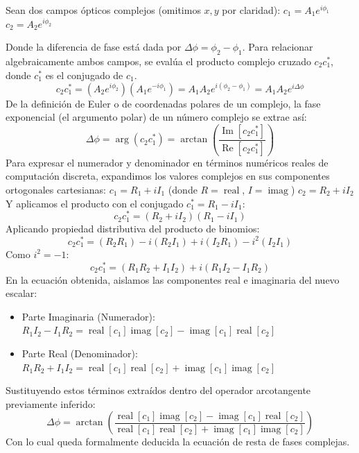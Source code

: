 \documentclass[12pt,letterpaper]{article}
\begin{document}
	Sean dos campos ópticos complejos (omitimos $x,y$ por claridad):
	$c_1 = A_1 e^{i\phi_1}$
	$c_2 = A_2 e^{i\phi_2}$
	
	Donde la diferencia de fase está dada por $\Delta\phi = \phi_2 - \phi_1$.
	Para relacionar algebraicamente ambos campos, se evalúa el producto complejo cruzado $c_2 c_1^*$, donde $c_1^*$ es el conjugado de $c_1$.
	\[
	c_2 c_1^* = (A_2 e^{i\phi_2})(A_1 e^{-i\phi_1}) = A_1 A_2 e^{i(\phi_2 - \phi_1)} = A_1 A_2 e^{i\Delta\phi}
	\]
	De la definición de Euler o de coordenadas polares de un complejo, la fase exponencial (el argumento polar) de un número complejo se extrae así:
	\[
	\Delta\phi = \arg(c_2 c_1^*) = \arctan\left(\frac{\operatorname{Im}[c_2 c_1^*]}{\operatorname{Re}[c_2 c_1^*]}\right)
	\]
	Para expresar el numerador y denominador en términos numéricos reales de computación discreta, expandimos los valores complejos en sus componentes ortogonales cartesianas:
	$c_1 = R_1 + i I_1$  (donde $R = \operatorname{real}$, $I = \operatorname{imag}$)
	$c_2 = R_2 + i I_2$
	Y aplicamos el producto con el conjugado $c_1^* = R_1 - i I_1$:
	\[
	c_2 c_1^* = (R_2 + i I_2)(R_1 - i I_1)
	\]
	Aplicando propiedad distributiva del producto de binomios:
	\[
	c_2 c_1^* = (R_2 R_1) - i(R_2 I_1) + i(I_2 R_1) - i^2(I_2 I_1)
	\]
	Como $i^2 = -1$:
	\[
	c_2 c_1^* = (R_1 R_2 + I_1 I_2) + i(R_1 I_2 - I_1 R_2)
	\]
	En la ecuación obtenida, aislamos las componentes real e imaginaria del nuevo escalar:
	\begin{itemize}
		\item Parte Imaginaria (Numerador): $R_1 I_2 - I_1 R_2 = \operatorname{real}[c_1]\operatorname{imag}[c_2] - \operatorname{imag}[c_1]\operatorname{real}[c_2]$
		\item Parte Real (Denominador): $R_1 R_2 + I_1 I_2 = \operatorname{real}[c_1]\operatorname{real}[c_2] + \operatorname{imag}[c_1]\operatorname{imag}[c_2]$
	\end{itemize}
	Sustituyendo estos términos extraídos dentro del operador arcotangente previamente inferido:
	\[
	\Delta\phi = \arctan\left( \frac{\operatorname{real}[c_1]\operatorname{imag}[c_2] - \operatorname{imag}[c_1]\operatorname{real}[c_2]}{\operatorname{real}[c_1]\operatorname{real}[c_2] + \operatorname{imag}[c_1]\operatorname{imag}[c_2]} \right)
	\]
	Con lo cual queda formalmente deducida la ecuación de resta de fases complejas.
	
\end{document}
